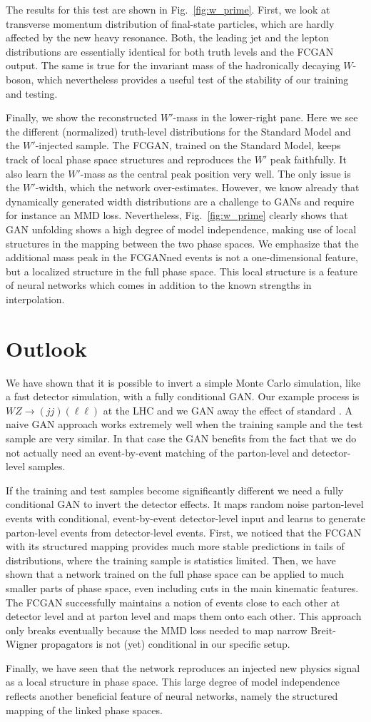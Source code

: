 The results for this test are shown in Fig.~\ref{fig:w_prime}. First,
we look at transverse momentum distribution of final-state particles,
which are hardly affected by the new heavy resonance. Both, the
leading jet and the lepton distributions are essentially identical for
both truth levels and the FCGAN output. The same is true for the
invariant mass of the hadronically decaying $W$-boson, which
nevertheless provides a useful test of the stability of our training
and testing.

Finally, we show the reconstructed $W'$-mass in the lower-right
pane. Here we see the different (normalized) truth-level distributions
for the Standard Model and the $W'$-injected sample. The FCGAN,
trained on the Standard Model, keeps track of local phase space
structures and reproduces the $W'$ peak faithfully. It also learn the
$W'$-mass as the central peak position very well. The only issue is
the $W'$-width, which the network over-estimates. However, we know
already that dynamically generated width distributions are a challenge
to GANs and require for instance an MMD loss.  Nevertheless,
Fig.~\ref{fig:w_prime} clearly shows that GAN unfolding shows a high
degree of model independence, making use of local structures in the
mapping between the two phase spaces. We emphasize that the additional
mass peak in the FCGANned events is not a one-dimensional feature, but
a localized structure in the full phase space. This local structure is
a feature of neural networks which comes in addition to the known
strengths in interpolation.

\section{Outlook}
We have shown that it is possible to invert a simple Monte Carlo
simulation, like a fast detector simulation, with a fully conditional
GAN. Our example process is $WZ \to (jj) (\ell \ell)$ at the LHC and
we GAN away the effect of standard \delphes. A naive GAN approach
works extremely well when the training sample and the test sample are
very similar. In that case the GAN benefits from the fact that we do
not actually need an event-by-event matching of the parton-level and
detector-level samples.

If the training and test samples become significantly different we
need a fully conditional GAN to invert the detector effects. It maps
random noise parton-level events with conditional, event-by-event
detector-level input and learns to generate parton-level events from
detector-level events.  First, we noticed that the FCGAN with its
structured mapping provides much more stable predictions in tails of
distributions, where the training sample is statistics limited.  Then,
we have shown that a network trained on the full phase space can be
applied to much smaller parts of phase space, even including cuts in
the main kinematic features. The FCGAN successfully maintains a notion
of events close to each other at detector level and at parton level
and maps them onto each other. This approach only breaks eventually
because the MMD loss needed to map narrow Breit-Wigner propagators is
not (yet) conditional in our specific setup.

Finally, we have seen that the network reproduces an injected new
physics signal as a local structure in phase space. This large degree
of model independence reflects another beneficial feature of neural
networks, namely the structured mapping of the linked phase spaces.

%
